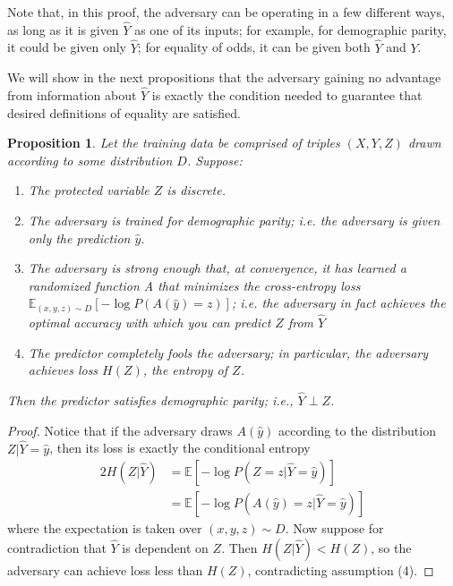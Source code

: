 \documentclass[letterpaper]{article} %
\newcommand{\notem}[1]{\textcolor{blue}{\it [#1 --M]}}
\newtheorem{proposition}{Proposition}
\theoremstyle{definition}
\begin{document}
Note that, in this proof, the adversary can be operating in a few different ways, as long as it is given $\hat Y$ as one of its inputs; for example, for demographic parity, it could be given only $\hat Y$; for equality of odds, it can be given both $\hat Y$ and $Y$.

We will show in the next propositions that the adversary gaining no advantage from information about $\hat Y$ is exactly the condition needed to guarantee that desired definitions of equality are satisfied.

\begin{proposition} \label{prop:parity}
Let the training data be comprised of triples $(X, Y, Z)$ drawn according to some distribution $D$. Suppose:
\begin{enumerate}
    \item The protected variable $Z$ is discrete.
    \item The adversary is trained for {\sc demographic parity}; i.e. the adversary is given only the prediction $\hat y$. 
    \item The adversary is strong enough that, at convergence, it has learned a randomized function A that minimizes the cross-entropy loss $\mathbb E_{(x, y, z) \sim D}[-\log P(A(\hat y) = z)]$; i.e. the adversary in fact achieves the optimal accuracy with which you can predict $Z$ from $\hat Y$
    \item The predictor completely fools the adversary; in particular, the adversary achieves loss $H(Z)$, the entropy of $Z$.
\end{enumerate}
Then the predictor satisfies {\sc demographic parity}; i.e., $\hat Y \perp Z$.
\end{proposition}
\begin{proof} 
Notice that if the adversary draws $A(\hat y)$ according to the distribution $Z|\hat Y = \hat y$, then its loss is exactly the conditional entropy
\begin{alignat*}{2}
H(Z|\hat Y) &= \mathbb E[-\log P(Z=z | \hat Y = \hat y)] \\
&= \mathbb E[-\log P(A(\hat y) = z | \hat Y = \hat y)]
\end{alignat*}
where the expectation is taken over $(x, y, z) \sim D$.
Now suppose for contradiction that $\hat Y$ is dependent on $Z$. Then $H(Z|\hat Y) < H(Z)$, so the adversary can achieve loss less than $H(Z)$, contradicting assumption (4).
\end{proof}
\end{document}
